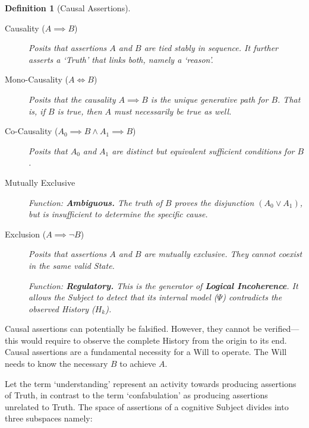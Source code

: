 \documentclass[11pt, a4paper]{article}
\theoremstyle{formalism}
\newtheorem{formalism}{Definition}
\begin{document}
\begin{formalism}[Causal Assertions]

    \begin{description}
        \item[Causality ($A \implies B$)] 

		Posits that assertions $A$ and $B$ are tied stably in sequence. It 
        further asserts a `Truth' that links both, namely a `reason'.
        
        \item[Mono-Causality ($A \iff B$)] 

		Posits that the causality $A \implies B$ is the \textit{unique}
        generative path for $B$. That is, if $B$ is true, then $A$ must necessarily be
        true as well.
        
        \item[Co-Causality ($A_0 \implies B \land A_1 \implies B$)] 

          Posits that $A_0$ and $A_1$ are distinct but \textit{equivalent} sufficient 
          conditions for $B$. 
        
        \item[Mutually Exclusive]

        \textit{Function:} \textbf{Ambiguous.} The truth of $B$ proves the disjunction $(A_0 \lor A_1)$, but is \textit{insufficient} to determine the specific cause.

        \item[Exclusion ($A \implies \neg B$)] 
        Posits that assertions $A$ and $B$ are mutually exclusive. They cannot coexist in the same valid State.
        
        \textit{Function:} \textbf{Regulatory.} This is the generator of \textbf{Logical Incoherence}. It allows the Subject to detect that its internal model ($\Psi$) contradicts the observed History ($H_k$).

    \end{description}
\end{formalism}

Causal assertions can potentially be falsified. However, they cannot be
verified---this would require to observe the complete History from the origin
to its end. Causal assertions are a fundamental necessity for a Will to
operate. The Will needs to know the necessary $B$ to achieve $A$.

Let the term `understanding' represent an activity towards producing assertions
of Truth, in contrast to the term `confabulation' as producing assertions
unrelated to Truth. The space of assertions of a cognitive Subject divides into
three subspaces namely:
\end{document}
